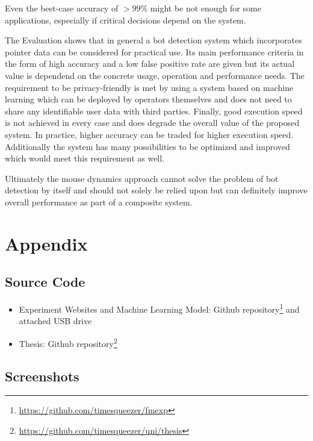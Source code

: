 \documentclass[
    fontsize=12pt,
    headings=small,
    parskip=half,           %
    bibliography=totoc,
    numbers=noenddot,       %
    open=any,               %
    final,                   %
    table
]{scrreprt}
\begin{document}
Even the best-case accuracy of $>99\%$ might be not enough for some applications, especially if critical decisions depend on the system.

The Evaluation shows that in general a bot detection system which incorporates pointer data can be considered for practical use. Its main performance criteria in the form of high accuracy and a low false positive rate are given but its actual value is dependend on the concrete usage, operation and performance needs. The requirement to be privacy-friendly is met by using a system based on machine learning which can be deployed by operators themselves and does not need to share any identifiable user data with third parties. Finally, good execution speed is not achieved in every case and does degrade the overall value of the proposed system. In practice, higher accuracy can be traded for higher execution speed. Additionally the system has many possibilities to be optimized and improved which would meet this requirement as well.

Ultimately the mouse dynamics approach cannot solve the problem of bot detection by itself and should not solely be relied upon but can definitely improve overall performance as part of a composite system.

\begin{raggedright}
  \printbibliography
\end{raggedright}

\chapter*{Appendix}

\section*{Source Code}

\begin{itemize}
    \item Experiment Websites and Machine Learning Model: Github repository\footnote{\url{https://github.com/timesqueezer/fmexp}} and attached USB drive
    \item Thesis: Github repository\footnote{\url{https://github.com/timesqueezer/uni/thesis}}
\end{itemize}

\section*{Screenshots}
\end{document}
